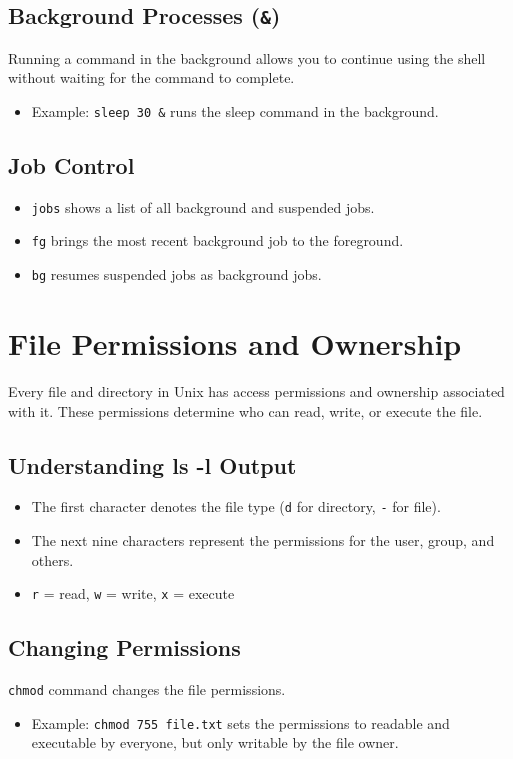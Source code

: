 \documentclass[12pt]{article}
\begin{document}
\subsection{Background Processes (\texttt{\&})}
Running a command in the background allows you to continue using the shell without waiting for the command to complete.
\begin{itemize}
    \item Example: \texttt{sleep 30 \&} runs the sleep command in the background.
\end{itemize}

\subsection{Job Control}
\begin{itemize}
    \item \texttt{jobs} shows a list of all background and suspended jobs.
    \item \texttt{fg} brings the most recent background job to the foreground.
    \item \texttt{bg} resumes suspended jobs as background jobs.
\end{itemize}

\section{File Permissions and Ownership}

Every file and directory in Unix has access permissions and ownership associated with it. These permissions determine who can read, write, or execute the file.

\subsection{Understanding ls -l Output}
\begin{itemize}
    \item The first character denotes the file type (\texttt{d} for directory, \texttt{-} for file).
    \item The next nine characters represent the permissions for the user, group, and others.
    \item \texttt{r} = read, \texttt{w} = write, \texttt{x} = execute
\end{itemize}

\subsection{Changing Permissions}
\texttt{chmod} command changes the file permissions.
\begin{itemize}
    \item Example: \texttt{chmod 755 file.txt} sets the permissions to readable and executable by everyone, but only writable by the file owner.
\end{itemize}
\end{document}
